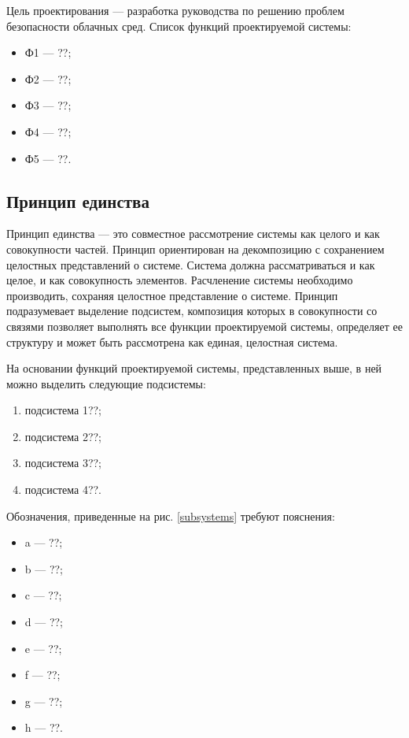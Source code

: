 Цель проектирования --- разработка руководства  по решению проблем безопасности облачных сред.
Список функций проектируемой системы:
\begin{itemize}
  \item Ф1 --- ??;
  \item Ф2 --- ??;
  \item Ф3 --- ??;
  \item Ф4 --- ??;
  \item Ф5 --- ??.
\end{itemize}

\subsection{Принцип единства}

Принцип единства --- это совместное рассмотрение системы как целого и как совокупности частей.
Принцип ориентирован на декомпозицию с сохранением целостных представлений о системе.
Система должна рассматриваться и как целое, и как совокупность элементов.
Расчленение системы необходимо производить, сохраняя целостное представление о системе.
Принцип подразумевает выделение подсистем, композиция которых в совокупности со связями позволяет выполнять все функции проектируемой системы, определяет ее структуру и может быть рассмотрена как единая, целостная система.

На основании функций проектируемой системы, представленных выше, в ней можно выделить следующие подсистемы:
\begin{enumerate}
  \item подсистема 1??;
  \item подсистема 2??;
  \item подсистема 3??;
  \item подсистема 4??.
\end{enumerate}


Обозначения, приведенные на рис. \ref{subsystems} требуют пояснения:
\begin{itemize}[label={}]
  \item a --- ??;
  \item b --- ??;
  \item c --- ??;
  \item d --- ??;
  \item e --- ??;
  \item f --- ??;
  \item g --- ??;
  \item h --- ??.
\end{itemize}

